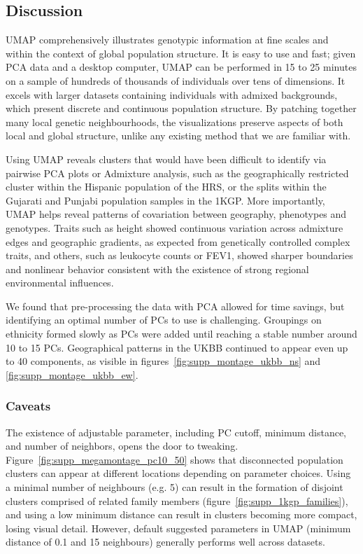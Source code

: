 \documentclass[12pt]{pnas-new}
\begin{document}
\subsection*{Discussion}
UMAP comprehensively illustrates genotypic information at fine scales and within the context of global population structure. It is easy to use and fast; given PCA data and a desktop computer, UMAP can be performed in 15 to 25 minutes on a sample of hundreds of thousands of individuals over tens of dimensions. It excels with larger datasets containing individuals with admixed backgrounds, which present discrete and continuous population structure. By patching together many local genetic neighbourhoods, the visualizations preserve aspects of both local and global structure, unlike any existing method that we are familiar with. 

Using UMAP reveals  clusters that would have been difficult to identify via pairwise PCA plots or Admixture analysis, such as the geographically restricted cluster within the Hispanic population of the HRS, or the splits within the Gujarati and Punjabi population samples in the 1KGP. More importantly, UMAP helps reveal patterns of covariation between geography, phenotypes and genotypes. Traits such as height showed continuous variation across admixture edges and geographic gradients, as expected from genetically controlled complex traits, and others, such as leukocyte counts or FEV1, showed sharper boundaries and nonlinear behavior consistent with the existence of strong regional environmental influences. 

We found that pre-processing the data with PCA allowed for time savings, but identifying an optimal number of PCs to use is challenging. Groupings on ethnicity formed slowly as PCs were added until reaching a stable number around 10 to 15 PCs. Geographical patterns in the UKBB continued to appear even up to 40 components, as visible in figures~\ref{fig:supp_montage_ukbb_ns} and \ref{fig:supp_montage_ukbb_ew}. 

\subsubsection*{Caveats}
The existence of adjustable parameter, including PC cutoff, minimum distance, and number of neighbors, opens the door to tweaking. Figure~\ref{fig:supp_megamontage_pc10_50} shows that disconnected population clusters can appear at different locations depending on parameter choices. Using a minimal number of neighbours (e.g. 5) can result in the formation of disjoint clusters comprised of related family members (figure~\ref{fig:supp_1kgp_families}), and using a low minimum distance can result in clusters becoming more compact, losing visual detail. However, default suggested parameters in UMAP (minimum distance of 0.1 and 15 neighbours) generally performs well across datasets. 
\end{document}
